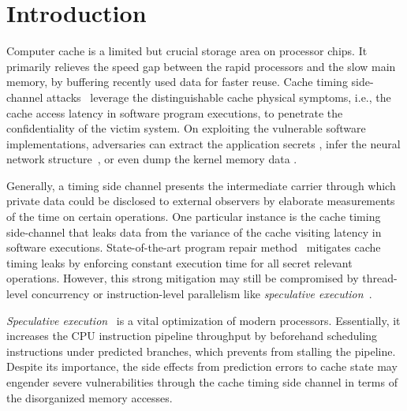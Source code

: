 \documentclass[sigconf]{acmart}
\begin{document}
\section{Introduction}
\label{sec:intro}
Computer cache is a limited but crucial storage area on processor chips. 
It primarily relieves the speed gap between the rapid processors and the 
slow main memory, by buffering recently used data for faster reuse. Cache 
timing side-channel attacks~\cite{Kocher96,DhemKLMQW98} leverage the 
distinguishable cache physical symptoms, i.e., the cache access latency 
in software program executions, to penetrate the confidentiality of the 
victim system. On exploiting the vulnerable software implementations, 
adversaries can extract the application secrets
\cite{OsvikST06,TromerOS10,GullaschBK11,CGM16}, infer the neural network 
structure~\cite{YanFT18,HuLDLXJDLSX18,HongDKLRKDD18,DudduSRB18}, or even 
dump the kernel memory data
\cite{HundWH13,LippSGPHFHMKGYH18,KocherGGHHLMPSY19,WeisseVMGKPSSWY18}.


Generally, a timing side channel presents the intermediate carrier through 
which private data could be disclosed to external observers by elaborate
measurements of the time on certain operations. One particular instance is 
the cache timing side-channel that leaks data from the variance of the 
cache visiting latency in software executions. State-of-the-art program 
repair method~\cite{WuGSW18} mitigates cache timing leaks by enforcing 
constant execution time for all secret relevant operations. However, this 
strong mitigation may still be compromised by thread-level concurrency
\cite{GuoWW18} or instruction-level parallelism like \textit{speculative 
execution}~\cite{kimuraKT1996}.


\textit{Speculative execution}~\cite{kimuraKT1996} is a vital optimization 
of modern processors. Essentially, it increases the CPU instruction pipeline 
throughput by beforehand scheduling instructions under predicted branches, 
which prevents from stalling the pipeline. Despite its importance, the side 
effects from prediction errors to cache state may engender severe 
vulnerabilities through the cache timing side channel
\cite{KocherGGHHLMPSY19,BulckMWGKPSWYS18,WeisseVMGKPSSWY18,IslamMBKGES19} 
in terms of the disorganized memory accesses.
\end{document}
